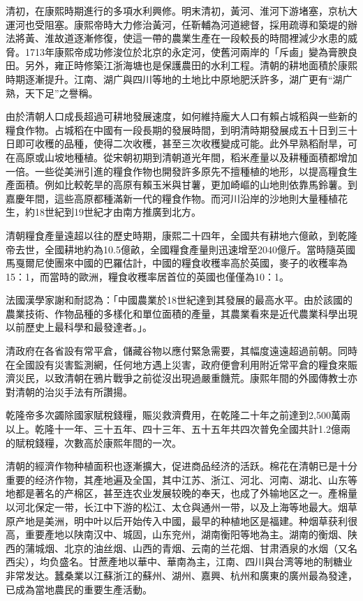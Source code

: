 清初，在康熙時期進行的多項水利興修。明末清初，黃河、淮河下游堵塞，京杭大運河也受阻塞。康熙帝時大力修治黃河，任靳輔為河道總督，採用疏導和築堤的辦法將黃、淮故道逐漸修復，使這一帶的農業生產在一段較長的時間裡減少水患的威脅。1713年康熙帝成功修浚位於北京的永定河，使舊河兩岸的「斥鹵」變為膏腴良田。另外，雍正時修築江浙海塘也是保護農田的水利工程。清朝的耕地面積於康熙時期逐漸提升。江南、湖广與四川等地的土地比中原地肥沃許多，湖广更有“湖广熟，天下足”之譽稱。

由於清朝人口成長超過可耕地發展速度，如何維持龐大人口有賴占城稻與一些新的糧食作物。占城稻在中國有一段長期的發展時間，到明清時期發展成五十日到三十日即可收穫的品種，使得二次收穫，甚至三次收穫變成可能。此外早熟稻耐旱，可在高原或山坡地種植。從宋朝初期到清朝道光年間，稻米產量以及耕種面積都增加一倍。一些從美洲引進的糧食作物也開發許多原先不擅種植的地形，以提高糧食生產面積。例如比較乾旱的高原有賴玉米與甘薯，更加崎嶇的山地則依靠馬鈴薯。到嘉慶年間，這些高原都種滿新一代的糧食作物。而河川沿岸的沙地則大量種植花生，約18世紀到19世紀才由南方推廣到北方。

清朝糧食產量遠超以往的歷史時期，康熙二十四年，全國共有耕地六億畝，到乾隆帝去世，全國耕地約為10.5億畝，全國糧食產量則迅速增至2040億斤。當時隨英國馬戛爾尼使團來中國的巴羅估計，中國的糧食收穫率高於英國，麥子的收穫率為15：1，而當時的歐洲，糧食收穫率居首位的英國也僅僅為10：1。

法國漢學家謝和耐認為：「中國農業於18世紀達到其發展的最高水平。由於該國的農業技術、作物品種的多樣化和單位面積的產量，其農業看來是近代農業科學出現以前歷史上最科學和最發達者。」。

清政府在各省設有常平倉，儲藏谷物以應付緊急需要，其幅度遠遠超過前朝。同時在全國設有災害監測網，任何地方遇上災害，政府便會利用附近常平倉的糧食來賑濟災民，以致清朝在鴉片戰爭之前從沒出現過嚴重饑荒。康熙年間的外國傳教士亦對清朝的治災手法有所讚揚。

乾隆帝多次蠲除國家賦稅錢糧，賑災救濟費用，在乾隆二十年之前達到2,500萬兩以上。乾隆十一年、三十五年、四十三年、五十五年共四次普免全國共計1.2億兩的賦稅錢糧，次數高於康熙年間的一次。

清朝的經濟作物种植面积也逐漸擴大，促进商品经济的活跃。棉花在清朝已是十分重要的经济作物，其產地遍及全国，其中江苏、浙江、河北、河南、湖北、山东等地都是著名的产棉区，甚至连农业发展较晚的奉天，也成了外输地区之一。產棉量以河北保定一带，长江中下游的松江、太仓與通州一带，以及上海等地最大。烟草原产地是美洲，明中叶以后开始传入中國，最早的种植地区是福建。种烟草获利很高，重要產地以陕南汉中、城固，山东兖州，湖南衡阳等地為主。湖南的衡烟、陕西的蒲城烟、北京的油丝烟、山西的青烟、云南的兰花烟、甘肃酒泉的水烟（又名西尖），均负盛名。甘蔗產地以華中、華南為主，江南、四川與台湾等地的制糖业非常发达。蠶桑業以江蘇浙江的蘇州、湖州、嘉興、杭州和廣東的廣州最為發達，已成為當地農民的重要生產活動。


